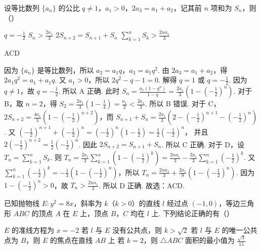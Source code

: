 \documentclass[UTF8,a4paper,oneside,11pt]{ctexbook}
\begin{document}
\begin{problem}
设等比数列 \(\{a_n\}\) 的公比 \(q\ne 1\)，\(a_1>0\)，\(2a_3=a_1+a_2\)，记其前 \(n\) 项和为 \(S_n\)，则（\quad）

\choices
    {\(q=-\frac{1}{2}\)}
    {\(S_n>\frac{2a_1}{3}\)}
    {\(2S_{n+2}=S_{n+1}+S_n\)}
    {\(\sum_{k=1}^{n} S_k>\frac{2na_1}{3}\)}
\end{problem}

\begin{answer}
ACD
\end{answer}

\begin{solution}
因为 \(\{a_n\}\) 是等比数列，所以 \(a_2=a_1q\)，\(a_3=a_1q^2\). 由 \(2a_3=a_1+a_2\)，得 \(2a_1q^2=a_1+a_1q\). 又 \(a_1>0\)，所以 \(2q^2-q-1=0\). 解得 \(q=1\) 或 \(q=-\frac{1}{2}\). 因为 \(q\ne 1\)，故 \(q=-\frac{1}{2}\). 所以 A 正确.
此时 \(S_n=\frac{a_1\left( 1-q^n \right)}{1-q}=\frac{2a_1}{3}\left( 1-\left( -\frac{1}{2} \right)^n \right)\).
对于 B，取 \(n=2\)，得 \(S_2=\frac{2a_1}{3}\left( 1-\frac{1}{4} \right)=\frac{a_1}{2}<\frac{2a_1}{3}\). 所以 B 错误.
对于 C，\(2S_{n+2}=\frac{4a_1}{3}\left( 1-\left( -\frac{1}{2} \right)^{n+2} \right)\)，而 \(S_{n+1}+S_n=\frac{2a_1}{3}\left( 2-\left( -\frac{1}{2} \right)^{n+1}-\left( -\frac{1}{2} \right)^n \right)\). 又 \(\left( -\frac{1}{2} \right)^{n+1}+\left( -\frac{1}{2} \right)^n=\left( -\frac{1}{2} \right)^n\left( 1-\frac{1}{2} \right)=\frac{1}{2}\left( -\frac{1}{2} \right)^n\)，
并且 \(2\left( -\frac{1}{2} \right)^{n+2}=\frac{1}{2}\left( -\frac{1}{2} \right)^n\). 因此 \(2S_{n+2}=S_{n+1}+S_n\). 所以 C 正确.
对于 D，设 \(T_n=\sum_{k=1}^{n} S_k\). 则 \(T_n=\frac{2a_1}{3}\sum_{k=1}^{n}\left( 1-\left( -\frac{1}{2} \right)^k \right)=\frac{2na_1}{3}-\frac{2a_1}{3}\sum_{k=1}^{n}\left( -\frac{1}{2} \right)^k\).
又 \(\sum_{k=1}^{n}\left( -\frac{1}{2} \right)^k=-\frac{1}{3}\left( 1-\left( -\frac{1}{2} \right)^n \right)\)，所以 \(T_n=\frac{2na_1}{3}+\frac{2a_1}{9}\left( 1-\left( -\frac{1}{2} \right)^n \right)\). 因为 \(1-\left( -\frac{1}{2} \right)^n>0\)，故 \(T_n>\frac{2na_1}{3}\). 所以 D 正确.
故选：ACD.
\end{solution}

\begin{problem}
已知抛物线 \(E:y^2=8x\)，斜率为 \(k\)（\(k>0\)）的直线 \(l\) 经过点 \(\left( -1,0 \right)\)，等边三角形 \(ABC\) 的顶点 \(A\) 在 \(E\) 上，顶点 \(B\)，\(C\) 均在 \(l\) 上. 下列结论正确的有（\quad）

\choices
    {\(E\) 的准线方程为 \(x=-2\)}
    {若 \(l\) 与 \(E\) 没有公共点，则 \(k>\sqrt{2}\)}
    {若 \(l\) 与 \(E\) 的唯一公共点为 \(B\)，则 \(E\) 的焦点在直线 \(AB\) 上}
    {若 \(k=2\)，则 \(\triangle ABC\) 面积的最小值为 \(\frac{\sqrt{3}}{15}\)}
\end{problem}
\end{document}
